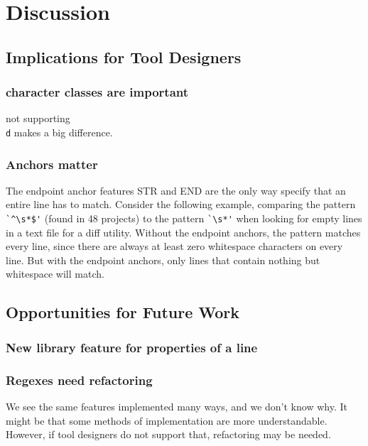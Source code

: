 \section{Discussion}
\label{sec:discussion}


\subsection{Implications for Tool Designers}

\subsubsection{character classes are important}
not supporting {\tt \\d} makes a big difference.

\subsubsection{Anchors matter}
The endpoint anchor features STR and END are the only way specify that an entire line has to match.  Consider the following example, comparing the pattern \verb!`^\s*$'! (found in 48 projects) to the pattern \verb!`\s*'! when looking for empty lines in a text file for a diff utility.  Without the endpoint anchors, the pattern matches every line, since there are always at least zero whitespace characters on every line.  But with the endpoint anchors, only lines that contain nothing but whitespace will match.

\subsection{Opportunities for Future Work}

\subsubsection{New library feature for properties of a line}

\subsubsection{Regexes need refactoring}
We see the same features implemented many ways, and we don't know why. It might be that some methods of implementation are more understandable. However, if tool designers do not support that, refactoring may be needed.

